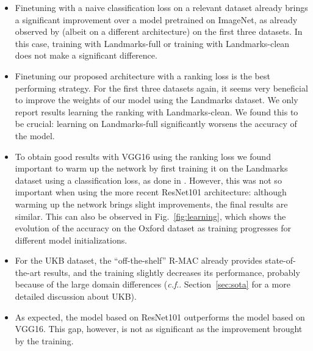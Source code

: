 \documentclass[twocolumn]{svjour3}          \smartqed  \usepackage{graphicx}
\makeatletter
\DeclareRobustCommand\onedot{\futurelet\@let@token\@onedot}
\def\@onedot{\ifx\@let@token.\else.\null\fi\xspace}
\def\cf{\emph{c.f}\onedot} \def\Cf{\emph{C.f}\onedot}
\makeatother
\begin{document}
\renewcommand\labelitemi{$\bullet$}
\begin{itemize}

\item Finetuning with a naive classification loss on a relevant dataset already brings a significant improvement over a model pretrained on ImageNet, as already observed by \cite{Babenko2014} (albeit on a different architecture) on the first three datasets.
In this case, training with Landmarks-full or training with Landmarks-clean does not make a significant difference. 

\item Finetuning our proposed architecture with a ranking loss is the best performing strategy. For the first three datasets again, it seems very beneficial to improve the weights of our model using the Landmarks dataset.
    We only report results learning the ranking with Landmarks-clean. We found this to be crucial: learning on Landmarks-full significantly worsens the accuracy of the model.
 
\item To obtain good results with VGG16 using the ranking loss we found important to warm up the network by first training it on the Landmarks dataset using a classification loss, as done in \cite{gordo2016deep}. However, this was not so important when using the more recent ResNet101 architecture: although warming up the network brings slight improvements, the final results are similar. This can also be observed in Fig.~\ref{fig:learning}, which shows the evolution of the accuracy on the Oxford dataset as training progresses for different model initializations.

\item  For the UKB dataset, the ``off-the-shelf'' R-MAC already provides state-of-the-art results, and the training slightly decreases its performance, probably because of the large domain differences (\cf Section~\ref{sec:sota} for a more detailed discussion about UKB).
 
\item As expected, the model based on ResNet101 outperforms the model based on VGG16. This gap, however, is not as significant as the improvement brought by the training. 


\end{itemize}
\end{document}
